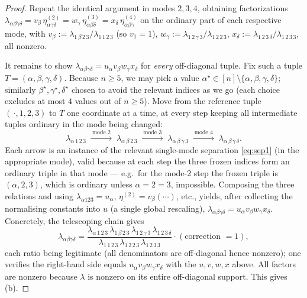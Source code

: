 \begin{proof}
Repeat the identical argument in modes $2,3,4$, obtaining factorizations
$\lambda_{\alpha\beta\gamma\delta}=v_\beta\,\eta^{(2)}_{\alpha\gamma\delta}
=w_\gamma\,\eta^{(3)}_{\alpha\beta\delta}=x_\delta\,\eta^{(4)}_{\alpha\beta\gamma}$ on the
ordinary part of each respective mode, with
$v_\beta:=\lambda_{1\,\beta\,2\,3}/\lambda_{1\,1\,2\,3}$ (so $v_1=1$),
$w_\gamma:=\lambda_{1\,2\,\gamma\,3}/\lambda_{1\,2\,2\,3}$,
$x_\delta:=\lambda_{1\,2\,3\,\delta}/\lambda_{1\,2\,3\,3}$, all nonzero. 

It remains to show $\lambda_{\alpha\beta\gamma\delta}=u_\alpha v_\beta w_\gamma x_\delta$ for
\emph{every} off-diagonal tuple. Fix such a tuple $T=(\alpha,\beta,\gamma,\delta)$. Because
$n\ge5$, we may pick a value $\alpha^\star\in[n]\setminus\{\alpha,\beta,\gamma,\delta\}$;
similarly $\beta^\star,\gamma^\star,\delta^\star$ chosen to avoid the relevant indices as we
go (each choice excludes at most $4$ values out of $n\ge5$). Move from the reference tuple
$(\,\cdot,1,2,3)$ to $T$ one coordinate at a time, at every step keeping all intermediate
tuples ordinary in the mode being changed:
\[
\lambda_{\alpha\,1\,2\,3}
\;\xrightarrow{\ \text{mode }2\ }\;\lambda_{\alpha\,\beta\,2\,3}
\;\xrightarrow{\ \text{mode }3\ }\;\lambda_{\alpha\,\beta\,\gamma\,3}
\;\xrightarrow{\ \text{mode }4\ }\;\lambda_{\alpha\,\beta\,\gamma\,\delta}.
\]
Each arrow is an instance of the relevant single-mode separation \eqref{eq:sep1} (in the
appropriate mode), valid because at each step the three frozen indices form an ordinary
triple in that mode — e.g.\ for the mode-$2$ step the frozen triple is $(\alpha,2,3)$, which is
ordinary unless $\alpha=2=3$, impossible. Composing the three relations and using
$\lambda_{\alpha 123}=u_\alpha$, $\eta^{(2)}_{\cdot}=v_\beta(\cdots)$, etc., yields, after
collecting the normalising constants into $u$ (a single global rescaling),
$\lambda_{\alpha\beta\gamma\delta}=u_\alpha v_\beta w_\gamma x_\delta$. Concretely, the
telescoping chain gives
\[
\lambda_{\alpha\beta\gamma\delta}
=\frac{\lambda_{\alpha\,1\,2\,3}\,\lambda_{1\,\beta\,2\,3}\,\lambda_{1\,2\,\gamma\,3}\,
\lambda_{1\,2\,3\,\delta}}{\lambda_{1\,1\,2\,3}\,\lambda_{1\,2\,2\,3}\,\lambda_{1\,2\,3\,3}}
\cdot(\text{correction }=1),
\]
each ratio being legitimate (all denominators are off-diagonal hence nonzero); one verifies
the right-hand side equals $u_\alpha v_\beta w_\gamma x_\delta$ with the $u,v,w,x$ above. All
factors are nonzero because $\lambda$ is nonzero on its entire off-diagonal support. This gives
(b).
\end{proof}

